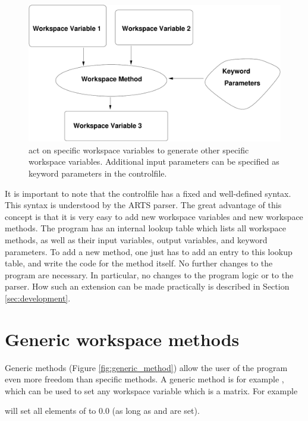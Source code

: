 \begin{figure}
  \begin{center}
    \includegraphics[width=\hsize,draft=false]{method}
    \caption{ act on specific workspace variables to
        generate other specific workspace variables. Additional input
        parameters can be specified as keyword parameters in the
        controlfile.}
    \label{fig:method}
  \end{center}
\end{figure}

It is important to note that the controlfile has a fixed and
well-defined syntax. This syntax is understood by the ARTS parser.
The great advantage of this concept is that it is very easy to add
new workspace variables and new workspace methods. The program has
an internal lookup table which lists all workspace methods, as well
as their input variables, output variables, and keyword
parameters. To add a new method, one just has to add an entry to
this lookup table, and write the code for the method itself. No
further changes to the program are necessary. In particular, no
changes to the program logic or to the parser. How such an extension
can be made practically is described in Section \ref{sec:development}.


\section{Generic workspace methods}
\label{sec:concept:generic}

Generic methods (Figure \ref{fig:generic_method}) allow the user of
the program even more freedom than specific methods. A generic method
is for example , which can be used to set any
workspace variable which is a matrix. For example
\begin{quote}
\end{quote}
will set all elements of  to 0.0 (as long as
 and  are set).

